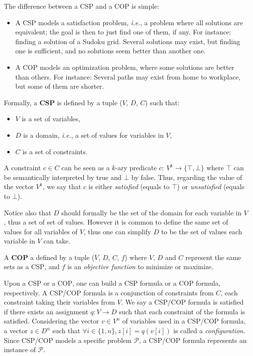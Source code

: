 \documentclass{article}
\newcommand{\csp}{\textsc{CSP}\xspace}
\newcommand{\cop}{\textsc{COP}\xspace}
\newcommand{\ie}{\textit{i.e.}}
\begin{document}
The difference between a \csp and a \cop is simple:
\begin{itemize}
\item A \csp  models a satisfaction problem, \ie, a  problem where all
  solutions are equivalent; the goal is then to just find one of them,
  if any. For  instance: finding a solution of a  Sudoku grid. Several
  solutions may exist, but finding one is sufficient, and no solutions
  seem better than another one.
\item A \cop models an  optimization problem, where some solutions are
  better than others.  For instance: Several paths may exist from home
  to workplace, but some of them are shorter.
\end{itemize}
Formally, a {\bf \csp} is defined by a tuple ($V$, $D$, $C$) such that:
\begin{itemize}
\item $V$ is a set of variables,
\item $D$ is a domain, \ie, a set of values for variables in $V$,
\item $C$ is a set of constraints.
\end{itemize}

A  constraint  $c   \in  C$  can  be  seen  as   a  $k$-ary  predicate
$c:~V^k\rightarrow\{\top,\bot\}$  where  $\top$  can  be  semantically
interpreted by true and $\bot$ by  false. Thus, regarding the value of
the vector $V^k$, we say that $c$ is either {\it satisfied} (equals to
$\top$) or {\it unsatisfied} (equals to $\bot$).

Notice also that $D$ should formally be the set of the domain for each
variable in $V$, thus a set of  set of values. However it is common to
define the same set  of values for all variables of  $V$, thus one can
simplify $D$ to be the set of values each variable in $V$ can take.

A {\bf \cop} a defined by a tuple ($V$, $D$, $C$, $f$) where $V$, $D$ and
$C$ represent the same sets as a \csp, and $f$ is an {\it objective
function} to minimize  or maximize.

Upon a \csp or a \cop, one can build a \csp formula or a \cop formula,
respectively.   A \csp/\cop  formula is  a conjunction  of constraints
from $C$,  each constraint taking their  variables from $V$. We  say a
\csp/\cop formula  is satisfied  if there exists  an assignment  $q: V
\rightarrow  D$   such  that  each   constraint  of  the   formula  is
satisfied. Considering the  vector $v \in V^n$ of variables  used in a
\csp/\cop formula, a vector $z \in D^n$ such that
$\forall i \in \{1,n\}, z[i] = q(v[i])$ 
is called a {\it configuration}.  Since
\csp/\cop models a specific problem $\mathcal{P}$, a \csp/\cop formula
represents an instance of $\mathcal{P}$.
\end{document}
